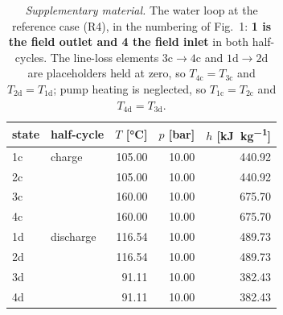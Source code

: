 \begin{table}[htbp]
\centering
\footnotesize
\caption{\emph{Supplementary material.} The water loop at the reference case (R4), in the numbering of Fig.~1: \textbf{1 is the field outlet and 4 the field inlet} in both half-cycles. The line-loss elements $3\mathrm{c}\to4\mathrm{c}$ and $1\mathrm{d}\to2\mathrm{d}$ are placeholders held at zero, so $T_{4\mathrm{c}}=T_{3\mathrm{c}}$ and $T_{2\mathrm{d}}=T_{1\mathrm{d}}$; pump heating is neglected, so $T_{1\mathrm{c}}=T_{2\mathrm{c}}$ and $T_{4\mathrm{d}}=T_{3\mathrm{d}}$.}
\label{tab:states-water}
\begin{tabular}{@{}l l r r r@{}}
\toprule
state & half-cycle & $T$ [\si{\celsius}] & $p$ [\si{\bar}] & $h$ [\si{\kilo\joule\per\kilogram}] \\
\midrule
1c & charge & 105.00 & 10.00 & 440.92 \\
2c &  & 105.00 & 10.00 & 440.92 \\
3c &  & 160.00 & 10.00 & 675.70 \\
4c &  & 160.00 & 10.00 & 675.70 \\
1d & discharge & 116.54 & 10.00 & 489.73 \\
2d &  & 116.54 & 10.00 & 489.73 \\
3d &  & 91.11 & 10.00 & 382.43 \\
4d &  & 91.11 & 10.00 & 382.43 \\
\bottomrule
\end{tabular}
\end{table}
